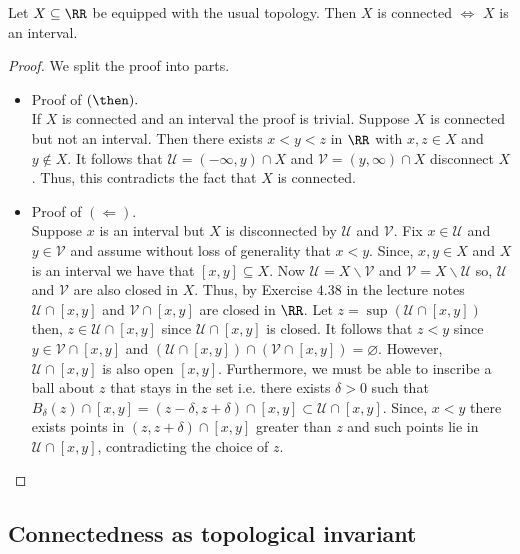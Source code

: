 \documentclass[12pt, a4paper]{article}
\begin{document}
\begin{mdthm}
    Let \(X \subseteq \RR\) be equipped with the usual topology. Then \(X\) is connected \(\iff\) \(X\) is an interval.
\end{mdthm}

\begin{proof}
    We split the proof into parts.
    \begin{itemize}
        \item Proof of \((\then).\) \\
        If \(X\) is connected and an interval the proof is trivial. Suppose \(X\) is connected but not an interval. Then there exists \(x<y<z\) in \(\RR\) with \(x,z \in X\) and \(y \not\in X\). It follows that \(\mathcal{U} = (-\infty,y) \cap X\) and \(\mathcal{V} = (y,\infty) \cap X\) disconnect \(X\). Thus, this contradicts the fact that \(X\) is connected.
        \item Proof of \((\Leftarrow).\) \\
        Suppose \(x\) is an interval but \(X\) is disconnected by \(\mathcal{U}\) and \(\mathcal{V}\). Fix \(x \in \mathcal{U}\) and \(y \in \mathcal{V}\) and assume without loss of generality that \(x<y\). Since, \(x,y \in X\) and \(X\) is an interval we have that \([x,y] \subseteq X\). Now \(\mathcal{U} = X \backslash \mathcal{V}\) and \(\mathcal{V} = X \backslash \mathcal{U}\) so, \(\mathcal{U}\) and \(\mathcal{V}\) are also closed in \(X\). Thus, by Exercise \(4.38\) in the lecture notes \(\mathcal{U} \cap [x,y]\) and \(\mathcal{V} \cap [x,y]\) are closed in \(\RR\). Let \(z = \sup(\mathcal{U} \cap [x,y])\) then, \(z \in \mathcal{U} \cap [x,y]\) since \(\mathcal{U} \cap [x,y]\) is closed. It follows that \(z<y\) since \(y \in \mathcal{V} \cap [x,y]\) and \((\mathcal{U} \cap [x,y]) \cap (\mathcal{V}\cap [x,y]) = \varnothing\).
        However, \(\mathcal{U} \cap [x,y]\) is also open \([x,y]\). Furthermore, we must be able to inscribe a ball about \(z\) that stays in the set i.e. there exists \(\delta>0\) such that \(B_{\delta}(z)\cap [x,y]= (z-\delta,z+\delta) \cap [x,y] \subset \mathcal{U} \cap [x,y]\). Since, \(x<y\) there exists points in \((z,z+\delta)\cap[x,y]\) greater than \(z\) and such points lie in \(\mathcal{U} \cap [x,y]\), contradicting the choice of \(z\).
    \end{itemize}
\end{proof}

\subsection{Connectedness as topological invariant}
\end{document}
